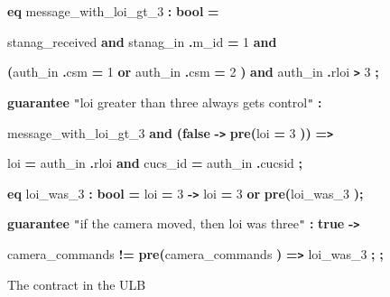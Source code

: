 \begin{figure}
{{\vspace{12pt}
{\color{color18} \textbf{eq}} message\_with\_loi\_gt\_3 {\color{color18} \textbf{:}} 
{\color{color18} \textbf{bool}} {\color{color18} \textbf{=}}    

\parindent=10pt
stanag\_received {\color{color18} \textbf{and}} stanag\_in{\color{color18} \textbf{.}}m\_id 
{\color{color18} \textbf{=}} 1 {\color{color18} \textbf{and}}    

\parindent=0pt
{\color{color18} \textbf{(}}auth\_in{\color{color18} \textbf{.}}csm {\color{color18} \textbf{=}} 
1 {\color{color18} \textbf{or}} auth\_in{\color{color18} \textbf{.}}csm {\color{color18} \textbf{=}} 
2{\color{color18} \textbf{)}}   {\color{color18} \textbf{and}} auth\_in{\color{color18} \textbf{.}}rloi 
{\color{color18} \textbf{\texttt{>}}} 3{\color{color18} \textbf{;      }}

\vspace{12pt}
{\color{color18} \textbf{guarantee}} {\color{color19} \texttt{"}loi greater than 
three always gets control\texttt{"}} {\color{color18} \textbf{:  }}

\parindent=7pt
message\_with\_loi\_gt\_3 {\color{color18} \textbf{and}} {\color{color18} \textbf{(false}} 
{\color{color18} \textbf{-\texttt{>}}} {\color{color18} \textbf{pre(}}loi {\color{color18} \textbf{=}} 
3{\color{color18} \textbf{))}} {\color{color18} \textbf{=\texttt{>}    }}

\parindent=14pt
loi {\color{color18} \textbf{=}} auth\_in{\color{color18} \textbf{.}}rloi {\color{color18} \textbf{and}} 
cucs\_id {\color{color18} \textbf{=}} auth\_in{\color{color18} \textbf{.}}cucsid{\color{color18} \textbf{;}}

\vspace{12pt}
\parindent=0pt
{\color{color18} \textbf{eq}} loi\_was\_3 {\color{color18} \textbf{:}} {\color{color18} \textbf{bool}} 
{\color{color18} \textbf{=}} loi {\color{color18} \textbf{=}} 3 {\color{color18} \textbf{-\texttt{>}}} 
loi {\color{color18} \textbf{=}} 3 {\color{color18} \textbf{or}} {\color{color18} \textbf{pre(}}loi\_was\_3{\color{color18} \textbf{);}}

\vspace{12pt}
{\color{color18} \textbf{guarantee}} {\color{color19} \texttt{"}if the camera moved, 
then loi was three\texttt{"}}{\color{color18} \textbf{:}} {\color{color18} \textbf{true}} 
{\color{color18} \textbf{-\texttt{>}  }}

\parindent=7pt
camera\_commands {\color{color18} \textbf{!=}} {\color{color18} \textbf{pre(}}camera\_commands{\color{color18} \textbf{)}} 
{\color{color18} \textbf{=\texttt{>}}} loi\_was\_3{\color{color18} \textbf{;}}
{\color{color18} \textbf{;}}

}%
}
\caption{The contract in the ULB}
\label{fig:ulb}
\end{figure}